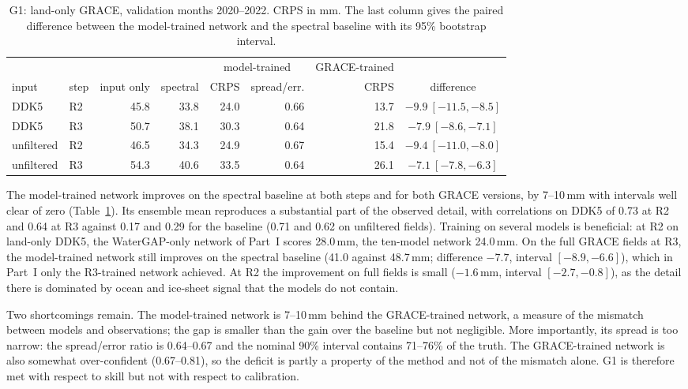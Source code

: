 \documentclass[11pt,a4paper]{article}
\begin{document}
\begin{table}[ht]
\centering\small\setlength{\tabcolsep}{4pt}
\caption{G1: land-only GRACE, validation months 2020--2022. CRPS in mm. The last column gives
the paired difference between the model-trained network and the spectral baseline with its
95\% bootstrap interval.}
\label{tab:g1}
\begin{tabular}{llrrrrrc}
  \toprule
  & & & & \multicolumn{2}{c}{model-trained} & GRACE-trained & \\
  \cmidrule(lr){5-6}
  input & step & input only & spectral & CRPS & spread/err. & CRPS & difference \\
  \midrule
  DDK5 & R2 & 45.8 & 33.8 & 24.0 & 0.66 & 13.7 & $-9.9\ [-11.5, -8.5]$ \\
  DDK5 & R3 & 50.7 & 38.1 & 30.3 & 0.64 & 21.8 & $-7.9\ [-8.6, -7.1]$ \\
  unfiltered & R2 & 46.5 & 34.3 & 24.9 & 0.67 & 15.4 & $-9.4\ [-11.0, -8.0]$ \\
  unfiltered & R3 & 54.3 & 40.6 & 33.5 & 0.64 & 26.1 & $-7.1\ [-7.8, -6.3]$ \\
  \bottomrule
\end{tabular}
\end{table}

The model-trained network improves on the spectral baseline at both steps and for both GRACE
versions, by 7--10\,mm with intervals well clear of zero (Table~\ref{tab:g1}). Its ensemble mean
reproduces a substantial part of the observed detail, with correlations on DDK5 of 0.73 at R2
and 0.64 at R3 against 0.17 and 0.29 for the baseline (0.71 and 0.62 on unfiltered fields). Training on several models is beneficial: at R2 on
land-only DDK5, the WaterGAP-only network of Part~I scores 28.0\,mm, the ten-model network
24.0\,mm. On the full GRACE fields at R3, the model-trained network still improves on the
spectral baseline (41.0 against 48.7\,mm; difference $-7.7$, interval $[-8.9, -6.6]$), which in
Part~I only the R3-trained network achieved. At R2 the improvement on full fields is small
($-1.6$\,mm, interval $[-2.7, -0.8]$), as the detail there is dominated by ocean and ice-sheet
signal that the models do not contain.

Two shortcomings remain. The model-trained network is 7--10\,mm behind the GRACE-trained network,
a measure of the mismatch between models and observations; the gap is smaller than the gain over
the baseline but not negligible. More importantly, its spread is too narrow: the spread/error
ratio is 0.64--0.67 and the nominal 90\% interval contains 71--76\% of the truth. The
GRACE-trained network is also somewhat over-confident (0.67--0.81), so the deficit is partly a
property of the method and not of the mismatch alone. G1 is therefore met with respect to skill
but not with respect to calibration.
\end{document}
